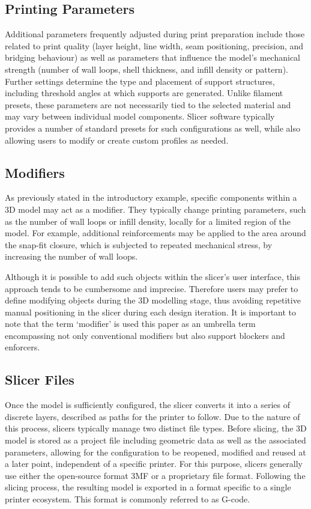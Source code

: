 \subsection{Printing Parameters}

Additional parameters frequently adjusted during print preparation include those related to print quality (\eg layer height, line width, seam positioning, precision, and bridging behaviour) as well as parameters that influence the model’s mechanical strength (\eg number of wall loops, shell thickness, and infill density or pattern).
Further settings determine the type and placement of support structures, including threshold angles at which supports are generated.
Unlike filament presets, these parameters are not necessarily tied to the selected material and may vary between individual model components.
Slicer software typically provides a number of standard presets for such configurations as well, while also allowing users to modify or create custom profiles as needed.

\subsection{Modifiers}

As previously stated in the introductory example, specific components within a 3D model may act as a modifier. 
They typically change printing parameters, such as the number of wall loops or infill density, locally for a limited region of the model.
For example, additional reinforcements may be applied to the area around the snap-fit closure, which is subjected to repeated mechanical stress, by increasing the number of wall loops.

Although it is possible to add such objects within the slicer's user interface, this approach tends to be cumbersome and imprecise.
Therefore users may prefer to define modifying objects during the 3D modelling stage, thus avoiding repetitive manual positioning in the slicer during each design iteration.
It is important to note that the term `modifier' is used this paper as an umbrella term encompassing not only conventional modifiers but also support blockers and enforcers.

\subsection{Slicer Files}

Once the model is sufficiently configured, the slicer converts it into a series of discrete layers, described as paths for the printer to follow. 
Due to the nature of this process, slicers typically manage two distinct file types. 
Before slicing, the 3D model is stored as a project file including geometric data as well as the associated parameters, allowing for the configuration to be reopened, modified and reused at a later point, independent of a specific printer. 
For this purpose, slicers generally use either the open-source format 3MF or a proprietary file format. 
Following the slicing process, the resulting model is exported in a format specific to a single printer ecosystem. 
This format is commonly referred to as G-code.\cite{kumar_printing_2023}

